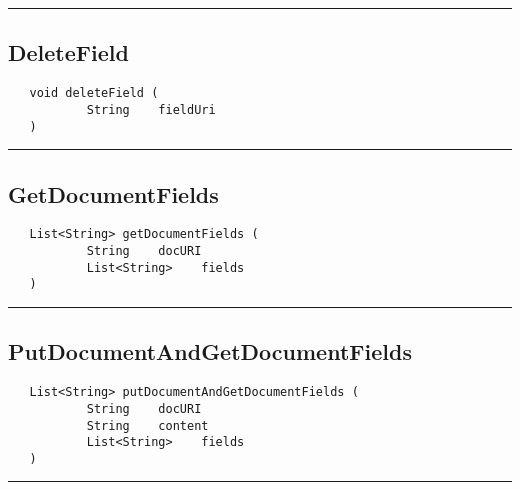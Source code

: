 \rule{15cm}{2pt}
\subsection{DeleteField}
\label{Api:DeleteField}
\begin{verbatim}
   void deleteField (
           String    fieldUri
   )
\end{verbatim}



\rule{15cm}{2pt}
\subsection{GetDocumentFields}
\label{Api:GetDocumentFields}
\begin{verbatim}
   List<String> getDocumentFields (
           String    docURI
           List<String>    fields
   )
\end{verbatim}



\rule{15cm}{2pt}
\subsection{PutDocumentAndGetDocumentFields}
\label{Api:PutDocumentAndGetDocumentFields}
\begin{verbatim}
   List<String> putDocumentAndGetDocumentFields (
           String    docURI
           String    content
           List<String>    fields
   )
\end{verbatim}



\rule{15cm}{2pt}
